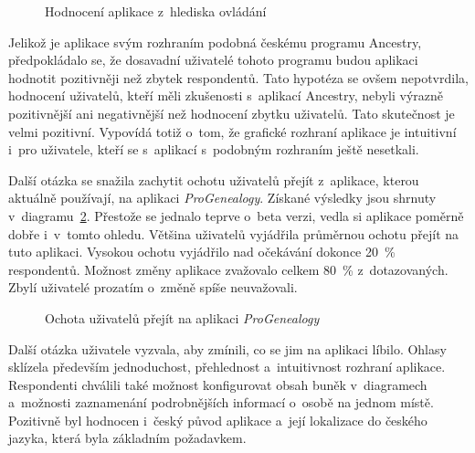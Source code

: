 	\begin{figure}[h]
		\caption{Hodnocení aplikace z~hlediska ovládání}
		\label{chart:hodnoOvla}
	\end{figure}
	
	Jelikož je aplikace svým rozhraním podobná českému programu Ancestry, předpokládalo se, že dosavadní uživatelé tohoto programu budou aplikaci hodnotit pozitivněji než zbytek respondentů. Tato hypotéza se ovšem nepotvrdila, hodnocení uživatelů, kteří měli zkušenosti s~aplikací Ancestry, nebyli výrazně pozitivnější ani negativnější než hodnocení zbytku uživatelů. Tato skutečnost je velmi pozitivní. Vypovídá totiž o~tom, že grafické rozhraní aplikace je intuitivní i~pro uživatele, kteří se s~aplikací s~podobným rozhraním ještě nesetkali.\par
	
	Další otázka se snažila zachytit ochotu uživatelů přejít z~aplikace, kterou aktuálně používají, na aplikaci \emph{ProGenealogy}. Získané výsledky jsou shrnuty v~diagramu~\ref{chart:hodnoPrechod}. Přestože se jednalo teprve o~beta verzi, vedla si aplikace poměrně dobře i~v~tomto ohledu. Většina uživatelů vyjádřila průměrnou ochotu přejít na tuto aplikaci. Vysokou ochotu vyjádřilo nad očekávání dokonce 20~\% respondentů. Možnost změny aplikace zvažovalo celkem 80~\% z~dotazovaných. Zbylí uživatelé prozatím o~změně spíše neuvažovali. \par
	\begin{figure}[h]
		\caption{Ochota uživatelů přejít na aplikaci \emph{ProGenealogy}}
		\label{chart:hodnoPrechod}
	\end{figure}
	
	Další otázka uživatele vyzvala, aby zmínili, co se jim na aplikaci líbilo. Ohlasy sklízela především jednoduchost, přehlednost a~intuitivnost rozhraní aplikace. Respondenti chválili také možnost konfigurovat obsah buněk v~diagramech a~možnosti zaznamenání podrobnějších informací o~osobě na jednom místě. Pozitivně byl hodnocen i~český původ aplikace a~její lokalizace do českého jazyka, která byla základním požadavkem.\par
	
